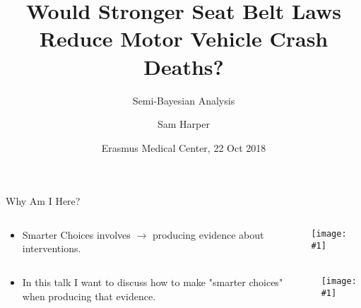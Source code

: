 \documentclass[english]{beamer}\usepackage[]{graphicx}\usepackage[]{color}
\newcommand\makebeamertitle{\frame{\maketitle}}%
\newcommand{\figw}[2]{\centerline{\texttt{[image: \#1]}}}
\begin{document}
\title[MVC-Bayes ]{Would Stronger Seat Belt Laws Reduce Motor Vehicle Crash Deaths?}

\subtitle{Semi-Bayesian Analysis}

\author[S. Harper ]{Sam Harper }


\date[22 Oct 2018]{Erasmus Medical Center, 22 Oct 2018}
\makebeamertitle
\begin{frame}{Why Am I Here?}


\begin{columns}
    \begin{column}{0.5\textwidth}
        \begin{itemize}
            \item[] Smarter Choices involves $\rightarrow$ producing evidence about interventions.
        \end{itemize}
    \end{column}
    \begin{column}{0.5\textwidth}
        \figw{SG-AL4.png}{.9}
    \end{column}
\end{columns}


\begin{columns}
    \begin{column}{0.4\textwidth}
        \begin{itemize}
            \item[] In this talk I want to discuss how to make "smarter choices" when producing that evidence.
        \end{itemize}
    \end{column}
    \begin{column}{0.6\textwidth}
        \figw{SG-NL-perinatal.png}{1}
    \end{column}
\end{columns}
\end{frame}
%
\end{document}
